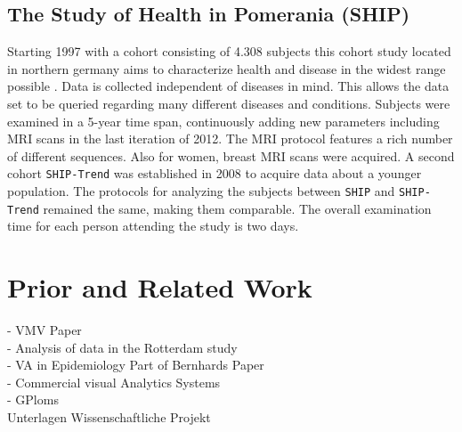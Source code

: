 \documentclass[journal]{style/vgtc}           %
\begin{document}
\subsection{The Study of Health in Pomerania (SHIP)}
Starting 1997 with a cohort consisting of 4.308 subjects this cohort study located in northern germany aims to characterize health and disease in the widest range possible \cite{Volzke2011}.
%
Data is collected independent of diseases in mind.
%
This allows the data set to be queried regarding many different diseases and conditions.
%
Subjects were examined in a 5-year time span, continuously adding new parameters including MRI scans in the last iteration of 2012.
%
The MRI protocol features a rich number of different sequences.
%
Also for women, breast MRI scans were acquired.
%
A second cohort \texttt{SHIP-Trend} was established in 2008 to acquire data about a younger population.
%
The protocols for analyzing the subjects between \texttt{SHIP} and \texttt{SHIP-Trend} remained the same, making them comparable.
%
The overall examination time for each person attending the study is two days.

\section{Prior and Related Work}
- VMV Paper\\
- Analysis of data in the Rotterdam study\\
- VA in Epidemiology Part of Bernhards Paper\\
	- Commercial visual Analytics Systems\\
- GPloms\\
Unterlagen Wissenschaftliche Projekt
\end{document}
